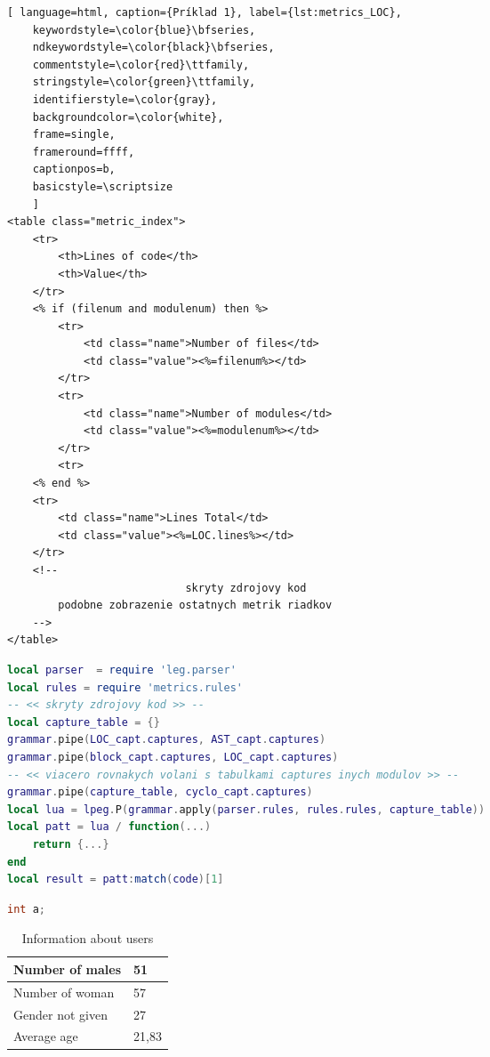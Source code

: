 \begin{lstlisting}[ language=html, caption={Príklad 1}, label={lst:metrics_LOC},
	keywordstyle=\color{blue}\bfseries,
	ndkeywordstyle=\color{black}\bfseries,
	commentstyle=\color{red}\ttfamily,
	stringstyle=\color{green}\ttfamily,
	identifierstyle=\color{gray},
	backgroundcolor=\color{white}, 
	frame=single, 
	frameround=ffff,
	captionpos=b,
	basicstyle=\scriptsize
	]
<table class="metric_index">
	<tr>
		<th>Lines of code</th>
		<th>Value</th>
	</tr>
	<% if (filenum and modulenum) then %>
		<tr>
			<td class="name">Number of files</td>
			<td class="value"><%=filenum%></td>
		</tr>
		<tr>
			<td class="name">Number of modules</td>
			<td class="value"><%=modulenum%></td>
		</tr>
		<tr>
	<% end %>
	<tr>
		<td class="name">Lines Total</td>
		<td class="value"><%=LOC.lines%></td>
	</tr>
	<!--
							skryty zdrojovy kod
		podobne zobrazenie ostatnych metrik riadkov
	-->
</table>
\end{lstlisting}

\begin{lstlisting}[language=lua, caption={Názov}, label=metrics.pipe]
local parser  = require 'leg.parser'
local rules = require 'metrics.rules'
-- << skryty zdrojovy kod >> --
local capture_table = {}
grammar.pipe(LOC_capt.captures, AST_capt.captures)
grammar.pipe(block_capt.captures, LOC_capt.captures)
-- << viacero rovnakych volani s tabulkami captures inych modulov >> --
grammar.pipe(capture_table, cyclo_capt.captures)
local lua = lpeg.P(grammar.apply(parser.rules, rules.rules, capture_table))
local patt = lua / function(...) 
	return {...} 
end
local result = patt:match(code)[1]
\end{lstlisting}

\begin{lstlisting}[language=C++, tabsize=2, caption={Manager}]
int a;
\end{lstlisting}



\begin{table}[ht]
    \centering
    \begin{tabular}{ | l | l | }
    \hline
    Number of males & 51 \\ \hline
    Number of woman & 57 \\ \hline
    Gender not given & 27 \\ \hline
    Average age & 21,83 \\ \hline
    \end{tabular}
    \caption{Information about users}
    \label{tab:table1}
\end{table}
